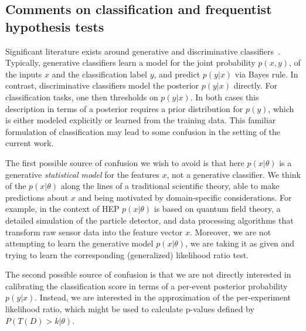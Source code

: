 \documentclass[11pt, oneside]{article}   	%
\begin{document}
\subsection{Comments on classification and frequentist hypothesis tests}

Significant literature exists around generative and discriminative classifiers~\citep{AndrewY.Ng}. Typically, generative classifiers learn a model for the joint probability $p(x,y)$, of the inputs $x$ and the classification label $y$, and predict $p(y|x)$ via Bayes rule. In contrast, discriminative classifiers model the posterior $p(y|x)$ directly. For classification tasks, one then thresholds on $p(y|x)$. In both cases this description in terms of a posterior requires a prior distribution for $p(y)$, which is either modeled explicitly or learned from the training data. 
This familiar formulation of classification may lead to some confusion in the setting of the current work. 

The first possible source of confusion we wish to avoid is that here $p(x|\theta)$  is a generative \textit{statistical model} for the features $x$, not a generative classifier. We think of the  $p(x|\theta)$ along the lines of a traditional scientific theory, able to make predictions about $x$ and being motivated by domain-specific considerations. For example, in the context of HEP $p(x|\theta)$ is based on quantum field theory, a detailed simulation of the particle detector, and data processing algorithms that transform raw sensor data into the feature vector $x$.  
Moreover, we are not attempting to learn the generative model $p(x|\theta)$, we are taking it as given and trying to learn the corresponding (generalized) likelihood ratio test.

The second possible source of confusion is that 
we are not directly interested in calibrating the classification score in terms of a per-event posterior probability $p(y|x)$. 
Instead, we are interested in the approximation of the per-experiment likelihood ratio, which might be used to calculate p-values defined by $P(T(D) > k |\theta)$.
%

\end{document}
